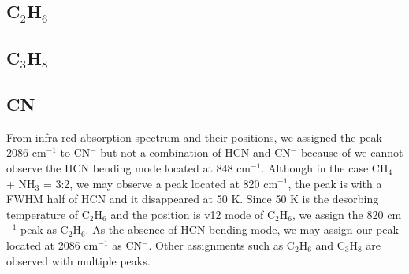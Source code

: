 \subsection{C$_2$H$_6$}
\subsection{C$_3$H$_8$}
\subsection{CN$^-$}

From infra-red absorption spectrum and their positions, we assigned the peak 2086 cm$^{-1}$ to CN$^-$  but not a combination of HCN and CN$^-$ because of we cannot observe the HCN bending mode located at 848 cm$^{-1}$. Although in the case CH$_4$ + NH$_3$ = 3:2, we may observe a peak located at 820 cm$^{-1}$, the peak is with a FWHM half of HCN and it disappeared at 50 K. Since 50 K is the desorbing temperature of C$_2$H$_6$ and the position is v12 mode of C$_2$H$_6$, we assign the 820 cm$^{-1}$ peak as C$_2$H$_6$. As the absence of HCN bending mode, we may assign our peak located at 2086 cm$^{-1}$ as CN$^-$. Other assignments such as C$_2$H$_6$ and C$_3$H$_8$ are observed with multiple peaks.\\

